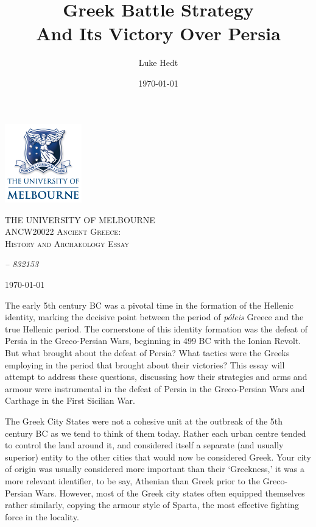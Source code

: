 \documentclass[a4paper, 12pt]{article}
\title{Greek Battle Strategy \\ And Its Victory Over Persia}
\author{Luke Hedt}
\date{\today}
\begin{document}
\begin{titlepage}
    \centering
    \includegraphics[width=0.25\textwidth]{UniLogo.png}\par\vspace{1cm}
    {\scshape\Large THE UNIVERSITY OF MELBOURNE \\
              \large ANCW20022 Ancient Greece: \\
              History and Archaeology Essay\par}
    \vspace{1.5cm}
    {\Huge \thetitle \par}
    \vfill

    {\Large\itshape \theauthor \hspace{1em} -- \hspace{1em} 832153 \par}
    \vspace{1.5cm}
    {\Large \today\par}
\end{titlepage}
\pagestyle{plain}

The early 5th century BC was a pivotal time in the formation of the Hellenic
identity, marking the decisive point between the period of \emph{p{\'o}leis} Greece
and the true Hellenic period. The cornerstone of this identity formation
was the defeat of Persia in the Greco-Persian Wars, beginning in 499 BC
with the Ionian Revolt. But what brought about the defeat of Persia? What tactics
were the Greeks employing in the period that brought about their victories?
This essay will attempt to address these questions, discussing how their
strategies and arms and armour were instrumental in the defeat of Persia
in the Greco-Persian Wars and
Carthage in the First Sicilian War.

\par\vspace{1em}

The Greek City States were not a cohesive unit at the outbreak of the 5th century
BC as we tend to think of them today. Rather each urban centre tended to control
the land around it, and considered itself a separate (and usually superior)
entity to the other cities that would now be considered Greek. Your city of
origin was usually considered more important than their `Greekness,' it was
a more relevant identifier, to be say, Athenian than Greek prior to the
Greco-Persian Wars. However, most of the Greek city states often equipped
themselves rather similarly, copying the armour style of Sparta, the most
effective fighting force in the locality.
\end{document}
